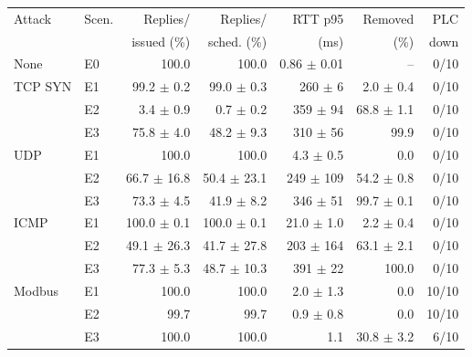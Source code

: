 \begin{tabular}{llrrrrr}
\toprule
Attack & Scen. & Replies/ & Replies/ & RTT p95 & Removed & PLC\\
 & & issued (\%) & sched. (\%) & (ms) & (\%) & down\\
\midrule
None & E0 & 100.0 & 100.0 & 0.86 $\pm$ 0.01 & -- & 0/10\\
\midrule
TCP SYN & E1 & 99.2 $\pm$ 0.2 & 99.0 $\pm$ 0.3 & 260 $\pm$ 6 & 2.0 $\pm$ 0.4 & 0/10\\
 & E2 & 3.4 $\pm$ 0.9 & 0.7 $\pm$ 0.2 & 359 $\pm$ 94 & 68.8 $\pm$ 1.1 & 0/10\\
 & E3 & 75.8 $\pm$ 4.0 & 48.2 $\pm$ 9.3 & 310 $\pm$ 56 & 99.9 & 0/10\\
\midrule
UDP & E1 & 100.0 & 100.0 & 4.3 $\pm$ 0.5 & 0.0 & 0/10\\
 & E2 & 66.7 $\pm$ 16.8 & 50.4 $\pm$ 23.1 & 249 $\pm$ 109 & 54.2 $\pm$ 0.8 & 0/10\\
 & E3 & 73.3 $\pm$ 4.5 & 41.9 $\pm$ 8.2 & 346 $\pm$ 51 & 99.7 $\pm$ 0.1 & 0/10\\
\midrule
ICMP & E1 & 100.0 $\pm$ 0.1 & 100.0 $\pm$ 0.1 & 21.0 $\pm$ 1.0 & 2.2 $\pm$ 0.4 & 0/10\\
 & E2 & 49.1 $\pm$ 26.3 & 41.7 $\pm$ 27.8 & 203 $\pm$ 164 & 63.1 $\pm$ 2.1 & 0/10\\
 & E3 & 77.3 $\pm$ 5.3 & 48.7 $\pm$ 10.3 & 391 $\pm$ 22 & 100.0 & 0/10\\
\midrule
Modbus & E1 & 100.0 & 100.0 & 2.0 $\pm$ 1.3 & 0.0 & 10/10\\
 & E2 & 99.7 & 99.7 & 0.9 $\pm$ 0.8 & 0.0 & 10/10\\
 & E3 & 100.0 & 100.0 & 1.1 & 30.8 $\pm$ 3.2 & 6/10\\
\bottomrule
\end{tabular}
